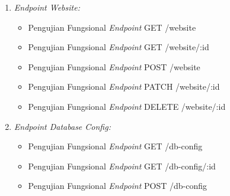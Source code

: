 \begin{enumerate}[label*=\arabic*.,ref=\arabic*]
\begin{enumerate}[label=\alph*.]
        \item \textit{Endpoint Website:} 
            \begin{itemize}
            
                \item Pengujian Fungsional \textit{Endpoint} GET /website
                \vspace{-0.5em}
                
                
                \item Pengujian Fungsional \textit{Endpoint} GET /website/:id
                \vspace{-0.5em}
                
                
                \item Pengujian Fungsional \textit{Endpoint} POST /website
                \vspace{-0.5em}
                
                
                \item Pengujian Fungsional \textit{Endpoint} PATCH /website/:id
                \vspace{-0.5em}
                
                
                \item Pengujian Fungsional \textit{Endpoint} DELETE /website/:id
                \vspace{-0.5em}
                
                
            \end{itemize}
    
        \item \textit{Endpoint Database Config:} 
            \begin{itemize}
            
                \item Pengujian Fungsional \textit{Endpoint} GET /db-config
                \vspace{-0.5em}
                
                
                \item Pengujian Fungsional \textit{Endpoint} GET /db-config/:id
                \vspace{-0.5em}
                
                
                \item Pengujian Fungsional \textit{Endpoint} POST /db-config
                \vspace{-0.5em}
                
                

\end{itemize}
\end{enumerate}
\end{enumerate}

